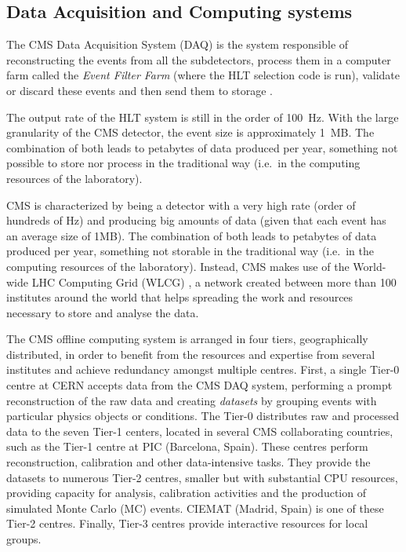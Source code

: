 \documentclass[../main.tex]{subfiles}
\begin{document}
\subsection{Data Acquisition and Computing systems}

The CMS Data Acquisition System (DAQ) is the system responsible of reconstructing the events from all the subdetectors, process them in a computer farm called the \textit{Event Filter Farm} (where the HLT selection code is run), validate or discard these events and then send them to storage \cite{intro:exp:cms}.

The output rate of the HLT system is still in the order of 100~Hz. With the large granularity of the CMS detector, the event size is approximately 1~MB. The combination of both leads to petabytes of data produced per year, something not possible to store nor process in the traditional way (i.e.~in the computing resources of the laboratory).


CMS is characterized by being a detector with a very high rate (order of hundreds of Hz) and producing big amounts of data (given that each event has an average size of 1MB). The combination of both leads to petabytes of data produced per year, something not storable in the traditional way (i.e.~in the computing resources of the laboratory). Instead, CMS makes use of the World-wide LHC Computing Grid (WLCG) \cite{intro:exp:wlcg_1, intro:exp:wlcg_2}, a network created between more than 100 institutes around the world that helps spreading the work and resources necessary to store and analyse the data.

The CMS offline computing system \cite{intro:exp:cms_computing} is arranged in four tiers, geographically distributed, in order to benefit from the resources and expertise from several ins\-ti\-tu\-tes and achieve redundancy amongst multiple centres. First, a single Tier-0 centre at CERN accepts data from the CMS DAQ system, performing a prompt reconstruction of the raw data and creating \textit{datasets} by grouping events with particular physics objects or conditions. The Tier-0 distributes raw and processed data to the seven Tier-1 centers, located in several CMS collaborating countries, such as the Tier-1 centre at PIC (Barcelona, Spain). These centres perform reconstruction, calibration and other data-intensive tasks. They provide the datasets to numerous Tier-2 centres, smaller but with substantial CPU resources, providing capacity for analysis, calibration activities and the production of simulated Monte Carlo (MC) events. CIEMAT (Madrid, Spain) is one of these Tier-2 centres. Finally, Tier-3 centres provide interactive resources for local groups.
\end{document}
